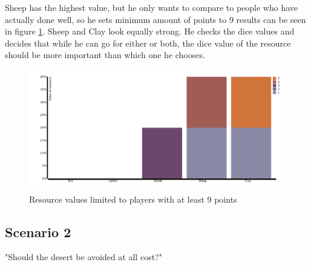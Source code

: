 \documentclass[journal]{vgtc}                %
\begin{document}
\noindent
Sheep has the highest value, but he only wants to compare to people who have
actually done well, so he sets minimum amount of points to 9 results can be
seen in figure \ref{fig:s14}. Sheep and Clay
look equally strong. He checks the dice values and decides that while he
can go for either or both, the dice value of the resource should be more
important than which one he chooses.
\begin{figure}[!ht]
  \centering
  \includegraphics[width=\linewidth]{scen1-4.png}
  \caption{Resource values limited to players with at least 9 points}
  \label{fig:s14}
\end{figure}
\noindent

\subsection{Scenario 2}

"Should the desert be avoided at all cost?"
\end{document}
